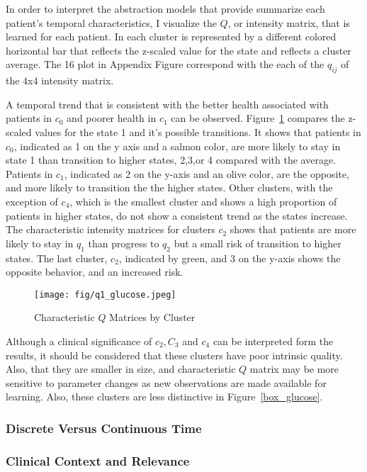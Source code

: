 In order to interpret the abstraction models that provide summarize each patient's temporal characteristics, I visualize the $Q$, or intensity matrix, that is learned for each patient.  In each cluster is represented by a different colored horizontal bar that reflects the z-scaled value for the state and reflects a cluster average.  The 16 plot in Appendix Figure\cite{glucose_qmatrix} correspond with the each of the $q_{ij}$ of the 4x4 intensity matrix.

A temporal trend that is consistent with the better health associated with patients in $c_0$ and poorer health in $c_1$ can be observed.  Figure~\ref{glucose_q1matrix} compares the z-scaled values for the state 1 and it's possible transitions.  It shows that patients in $c_0$, indicated as 1 on the y axis and a salmon color, are more likely to stay in state 1 than transition to higher states, 2,3,or 4 compared with the average.  Patients in $c_1$, indicated as 2 on the y-axis and an olive color,  are the opposite, and more likely to transition the the higher states.  Other clusters, with the exception of $c_4$, which is the smallest cluster and shows a high proportion of patients in higher states, do not show a consistent trend as the states increase.  The characteristic intensity matrices for clusters $c_2$ shows that patients are more likely to stay in $q_1$ than progress to $q_2$ but a small risk of transition to higher states.  The last cluster, $c_2$, indicated by green, and 3 on the y-axis shows the opposite behavior, and an increased risk.

 \begin{figure}[ht]
  \centering
  \texttt{[image: fig/q1\_glucose.jpeg]}\\
  \caption{Characteristic $Q$ Matrices by Cluster}\label{glucose_q1matrix}
\end{figure}
 
 
 Although a clinical significance of $c_2, C_3$ and $c_4$ can be interpreted form the results, it should be considered that these clusters have poor intrinsic quality.  Also, that they are smaller in size, and characteristic $Q$ matrix may be more sensitive to parameter changes as new observations are made available for learning.  Also, these clusters are less distinctive in Figure~\ref{box_glucose}.
\subsubsection{Discrete Versus Continuous Time}


\subsubsection{Clinical Context and Relevance}

 
 
